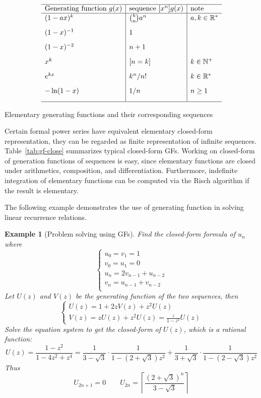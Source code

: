\documentclass[a4paper]{article}
\newtheorem{example}[theorem]{Example}
\begin{document}
\begin{table}[htbp]
	\label{tab:gf-close}
	\[
		\begin{array}{l|l|l}
			\hline
			\text{Generating function }g(x) & \text{sequence }[x^n]g(x) & \text{note}             \\
			\hline
			(1-ax)^k                        & \binom{k}{n}a^n           & a,k\in\mathbb{R}^{\ast} \\[2ex]
			(1-x)^{-1}                      & 1                         &                         \\[2ex]
			(1-x)^{-2}                      & n+1                       &                         \\[2ex]
			x^k                             & [n=k]                     & k\in\mathbb{N}^{+}      \\[2ex]
			e^{kx}                          & k^n/n!                    & k\in\mathbb{R}^{\ast}   \\[2ex]
			-\ln(1-x)                       & 1/n                       & n\geq 1                 \\[2ex]
			\hline
		\end{array}
	\]
	\caption{Elementary generating functions and their corresponding sequences}
\end{table}
Certain formal power series have equivalent elementary closed-form representation, they can be regarded as finite representation of infinite sequences. Table~\ref{tab:gf-close} summarizes typical closed-form GFs.
Working on closed-form of generation functions of sequences is easy, since elementary functions are closed under arithmetics, composition, and differentiation.
Furthermore, indefinite integration of elementary functions can be computed via the Risch algorithm if the result is elementary.\par
The following example demonstrates the use of generating function in solving linear recurrence relations.

\begin{example}[Problem solving using GFs]
	Find the closed-form formula of \(u_n\) where
	\[
		\begin{cases}
			u_0 = v_1 = 1            \\
			v_0 = u_1 = 0            \\
			u_n = 2v_{n-1} + u_{n-2} \\
			v_n =  u_{n-1} + v_{n-2} \\
		\end{cases}
	\]
	Let \(U(z)\) and \(V(z)\) be the generating function of the two sequences, then
	\[
		\begin{cases}
			U(z) = 1 + 2z V(z) + z^2 U(z) \\
			V(z) = zU(z)+z^2U(z) = \frac{z}{1-z^2}U(z)
		\end{cases}
	\]
	Solve the equation system to get the closed-form of \(U(z)\), which is a rational function:
	\[
		U(z)={\frac {1-z^{2}}{1-4z^{2}+z^{4}}}={\frac {1}{3-{\sqrt {3}}}}\cdot {\frac {1}{1-\left(2+{\sqrt {3}}\right)z^{2}}}+{\frac {1}{3+{\sqrt {3}}}}\cdot {\frac {1}{1-\left(2-{\sqrt {3}}\right)z^{2}}}
	\]
	Thus
	\[
		U_{2n+1} = 0 \qquad U_{2n} = \left\lceil \frac{(2+\sqrt 3)^n}{3-\sqrt 3} \right\rceil
	\]
\end{example}
\end{document}
